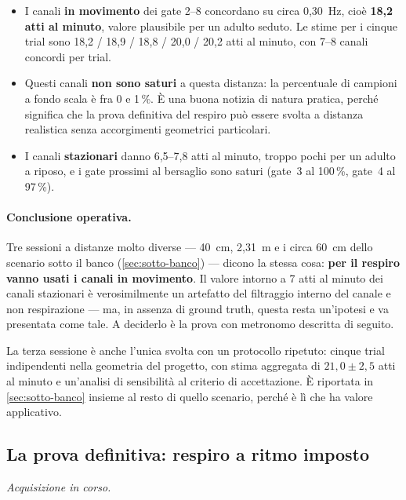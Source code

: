 \begin{itemize}[leftmargin=1.4em,itemsep=3pt]
  \item I canali \textbf{in movimento} dei gate 2--8 concordano su circa 0,30~Hz,
        cioè \textbf{18,2 atti al minuto}, valore plausibile per un adulto seduto.
        Le stime per i cinque trial sono 18,2 / 18,9 / 18,8 / 20,0 / 20,2 atti al
        minuto, con 7--8 canali concordi per trial.
  \item Questi canali \textbf{non sono saturi} a questa distanza: la percentuale di
        campioni a fondo scala è fra 0 e 1\,\%. È una buona notizia di natura
        pratica, perché significa che la prova definitiva del respiro può essere
        svolta a distanza realistica senza accorgimenti geometrici particolari.
  \item I canali \textbf{stazionari} danno 6,5--7,8 atti al minuto, troppo pochi per
        un adulto a riposo, e i gate prossimi al bersaglio sono saturi (gate~3 al
        100\,\%, gate~4 al 97\,\%).
\end{itemize}

\paragraph{Conclusione operativa.} Tre sessioni a distanze molto diverse --- 40~cm,
2,31~m e i circa 60~cm dello scenario sotto il banco (\cref{sec:sotto-banco}) ---
dicono la stessa cosa: \textbf{per il respiro vanno usati i canali in movimento}. Il
valore intorno a 7 atti al minuto dei canali stazionari è verosimilmente un artefatto
del filtraggio interno del canale e non respirazione --- ma, in assenza di ground
truth, questa resta un'ipotesi e va presentata come tale. A deciderlo è la prova con
metronomo descritta di seguito.

La terza sessione è anche l'unica svolta con un protocollo ripetuto: cinque trial
indipendenti nella geometria del progetto, con stima aggregata di
$21{,}0 \pm 2{,}5$ atti al minuto e un'analisi di sensibilità al criterio di
accettazione. È riportata in \cref{sec:sotto-banco} insieme al resto di quello
scenario, perché è lì che ha valore applicativo.

\subsection{La prova definitiva: respiro a ritmo imposto}
\label{sec:respiro-metronomo}

\emph{Acquisizione in corso.}

